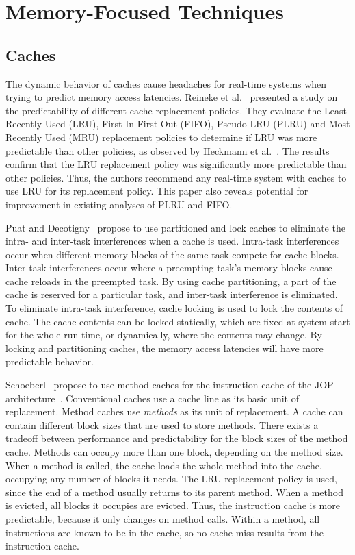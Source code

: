 \section{Memory-Focused Techniques}
\subsection{Caches}
The dynamic behavior of caches cause headaches for real-time systems when trying to predict memory access latencies.
Reineke et al.~\cite{Reineke07TimingPredictability} presented a study on the predictability of different cache replacement policies.
They evaluate the Least Recently Used (LRU), First In First Out (FIFO), Pseudo LRU (PLRU) and Most Recently Used (MRU) replacement policies to determine if LRU was more predictable than other policies, as observed by Heckmann et al.~\cite{Heckmann2003processor}.    
The results confirm that the LRU replacement policy was significantly more predictable than other policies.
Thus, the authors recommend any real-time system with caches to use LRU for its replacement policy. 
This paper also reveals potential for improvement in existing analyses of PLRU and FIFO.

Puat and Decotigny~\cite{Puaut02} propose to use partitioned and lock caches to eliminate the intra- and inter-task interferences when a cache is used. 
Intra-task interferences occur when different memory blocks of the same task compete for cache blocks.
Inter-task interferences occur where a preempting task's memory blocks cause cache reloads in the preempted task.
By using cache partitioning, a part of the cache is reserved for a particular task, and inter-task interference is eliminated.
To eliminate intra-task interference, cache locking is used to lock the contents of cache.
The cache contents can be locked statically, which are fixed at system start for the whole run time, or dynamically, where the contents may change.   
By locking and partitioning caches, the memory access latencies will have more predictable behavior. 

Schoeberl~\cite{jop:jtres_cache} propose to use method caches for the instruction cache of the JOP architecture~\cite{jop:wcet}.
Conventional caches use a cache line as its basic unit of replacement. 
Method caches use \emph{methods} as its unit of replacement. 
A cache can contain different block sizes that are used to store methods. 
There exists a tradeoff between performance and predictability for the block sizes of the method cache. 
Methods can occupy more than one block, depending on the method size. 
When a method is called, the cache loads the whole method into the cache, occupying any number of blocks it needs.
The LRU replacement policy is used, since the end of a method usually returns to its parent method. 
When a method is evicted, all blocks it occupies are evicted. 
Thus, the instruction cache is more predictable, because it only changes on method calls. 
Within a method, all instructions are known to be in the cache, so no cache miss results from the instruction cache.
 
